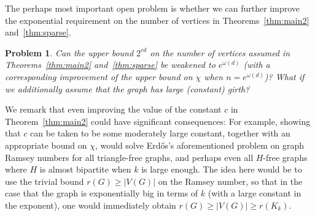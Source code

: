 \documentclass[10pt]{amsart}
\newtheorem{problem}[theorem]{Problem}
\theoremstyle{definition}
\begin{document}
The perhaps most important open problem is whether we can further improve the exponential requirement on the number of vertices in Theorems~\ref{thm:main2} and~\ref{thm:sparse}.
\begin{problem}
Can the upper bound $2^{cd}$ on the number of vertices assumed in Theorems~\ref{thm:main2} and~\ref{thm:sparse} be weakened to $e^{\omega(d)}$ (with a corresponding improvement of the upper bound on $\chi$ when $n=e^{\omega(d)}$)? What if we additionally assume that the graph has large (constant) girth?
\end{problem}
We remark that even improving the value of the constant $c$ in Theorem~\ref{thm:main2} could have significant consequences: For example, showing that $c$ can be taken to be some moderately large constant, together with an appropriate bound on $\chi$, would solve Erd\H{o}s's aforementioned problem on graph Ramsey numbers for all triangle-free graphs, and perhaps even all $H$-free graphs where $H$ is almost bipartite when $k$ is large enough. The idea here would be to use the trivial bound $r(G)\ge |V(G)|$ on the Ramsey number, so that in the case that the graph is exponentially big in terms of $k$ (with a large constant in the exponent), one would immediately obtain $r(G)\ge |V(G)|\ge r(K_k)$. 
\end{document}
